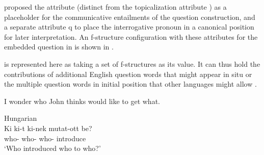 \documentclass[output=paper,hidelinks]{langscibook}
\begin{document}
 
\citet{kaplanbresnan82} proposed the attribute \FOCUS (distinct from the topicalization attribute \TOPIC) as a placeholder for the communicative entailments of the question construction, and a separate attribute \attr q to place the interrogative pronoun in a canonical position for later interpretation.  An f-structure configuration with these attributes for the embedded question in  is shown in .

\ea\label{cqfs}
\z

\noindent \FOCUS is represented here as taking a set of f-structures as its value. It can thus hold the contributions of additional English question words that might appear in situ  or the multiple question words in initial position that other languages might allow .

\ea\label{focusset}
\ea\label{englishinsitu}
I wonder who John thinks would like to get what.

\ex\label{hungarian}
 Hungarian \citep[from][]{Mycock07}\\
 \gll Ki      ki-t     ki-nek    mutat-ott be?\\
        who-{\NOM}    who-{\ACC} who-{\DAT} introduce \\
\glt `Who introduced who to who?'
\z\z
\end{document}
